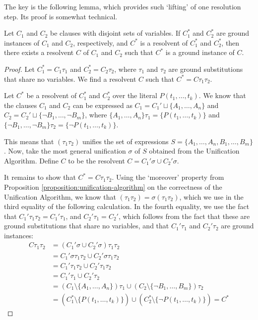 The key is the following lemma, which provides such `lifting' of one resolution step. Its proof is somewhat technical.

\begin{lemma}\label{lemma:lifting-lemma}
Let $C_1$ and $C_2$ be clauses with disjoint sets of variables. If $C^*_1$ and $C^*_2$ are ground instances of $C_1$ and $C_2$, respectively, and $C^*$ is a resolvent of $C^*_1$ and $C^*_2$, then there exists a resolvent $C$ of $C_1$ and $C_2$ such that $C^*$ is a ground instance of $C$.
\end{lemma}
\begin{proof}
Let $C^*_1=C_1\tau_1$ and $C^*_2=C_2\tau_2$, where $\tau_1$ and $\tau_2$ are ground substitutions that share no variables. We find a resolvent $C$ such that $C^*=C\tau_1\tau_2$.

Let $C^*$ be a resolvent of $C_1^*$ and $C_2^*$ over the literal $P(t_1,\dots,t_k)$. We know that the clauses $C_1$ and $C_2$ can be expressed as $C_1=C_1' \sqcup \{A_1,\dots,A_n\}$ and $C_2=C_2' \sqcup \{\neg B_1,\dots,\neg B_m\}$, where $\{A_1,\dots,A_n\}\tau_1=\{P(t_1,\dots,t_k)\}$ and $\{\neg B_1,\dots,\neg B_m\}\tau_2=\{\neg P(t_1,\dots,t_k)\}$.

This means that $(\tau_1\tau_2)$ unifies the set of expressions $S=\{A_1,\dots,A_n,B_1,\dots,B_m\}$. Now, take the most general unification $\sigma$ of $S$ obtained from the Unification Algorithm. Define $C$ to be the resolvent $C=C_1'\sigma \cup C_2'\sigma$.

It remains to show that $C^*=C\tau_1\tau_2$. Using the `moreover' property from Proposition \ref{proposition:unification-algorithm} on the correctness of the Unification Algorithm, we know that $(\tau_1\tau_2)=\sigma(\tau_1\tau_2)$, which we use in the third equality of the following calculation. In the fourth equality, we use the fact that $C_1'\tau_1\tau_2=C_1'\tau_1$, and $C_2'\tau_1=C_2'$, which follows from the fact that these are ground substitutions that share no variables, and that $C_1'\tau_1$ and $C_2'\tau_2$ are ground instances:
\begin{align*}
    C\tau_1\tau_2&= (C_1'\sigma \cup C_2'\sigma)\tau_1\tau_2\\
    &=C_1'\sigma\tau_1\tau_2 \cup C_2'\sigma\tau_1\tau_2\\
    &=C_1'\tau_1\tau_2 \cup C_2'\tau_1\tau_2\\
    &=C_1'\tau_1 \cup C_2'\tau_2\\
    &=(C_1\setminus\{A_1,\dots,A_n\})\tau_1\cup (C_2\setminus\{\neg B_1,\dots,B_m\})\tau_2\\
    &=(C_1^*\setminus\{P(t_1,\dots,t_k)\})\cup(C_2^*\setminus \{\neg P(t_1,\dots,t_k)\})=C^*
\end{align*}
\end{proof}

